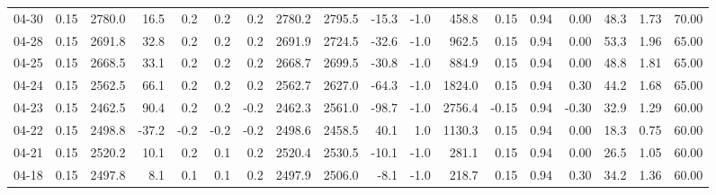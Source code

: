 \begin{threeparttable}
{\begin{tabular}{lrrrrrrrrrrrrrrrrr}
  04-30 &     0.15 & 2780.0 &              16.5 &               0.2 &                0.2 &                0.2 & 2780.2 & 2795.5 &      -15.3 &                     -1.0 &               458.8 &       0.15 &      0.94 &           0.00 &             48.3 &            1.73 &                  70.00 \\
  04-28 &     0.15 & 2691.8 &              32.8 &               0.2 &                0.2 &                0.2 & 2691.9 & 2724.5 &      -32.6 &                     -1.0 &               962.5 &       0.15 &      0.94 &           0.00 &             53.3 &            1.96 &                  65.00 \\
  04-25 &     0.15 & 2668.5 &              33.1 &               0.2 &                0.2 &                0.2 & 2668.7 & 2699.5 &      -30.8 &                     -1.0 &               884.9 &       0.15 &      0.94 &           0.00 &             48.8 &            1.81 &                  65.00 \\
  04-24 &     0.15 & 2562.5 &              66.1 &               0.2 &                0.2 &                0.2 & 2562.7 & 2627.0 &      -64.3 &                     -1.0 &              1824.0 &       0.15 &      0.94 &           0.30 &             44.2 &            1.68 &                  65.00 \\
  04-23 &     0.15 & 2462.5 &              90.4 &               0.2 &                0.2 &               -0.2 & 2462.3 & 2561.0 &      -98.7 &                     -1.0 &              2756.4 &      -0.15 &      0.94 &          -0.30 &             32.9 &            1.29 &                  60.00 \\
  04-22 &     0.15 & 2498.8 &             -37.2 &              -0.2 &               -0.2 &               -0.2 & 2498.6 & 2458.5 &       40.1 &                      1.0 &              1130.3 &       0.15 &      0.94 &           0.00 &             18.3 &            0.75 &                  60.00 \\
  04-21 &     0.15 & 2520.2 &              10.1 &               0.2 &                0.1 &                0.2 & 2520.4 & 2530.5 &      -10.1 &                     -1.0 &               281.1 &       0.15 &      0.94 &           0.00 &             26.5 &            1.05 &                  60.00 \\
  04-18 &     0.15 & 2497.8 &               8.1 &               0.1 &                0.1 &                0.2 & 2497.9 & 2506.0 &       -8.1 &                     -1.0 &               218.7 &       0.15 &      0.94 &           0.30 &             34.2 &            1.36 &                  60.00 \\

\end{tabular}}
\end{threeparttable}
